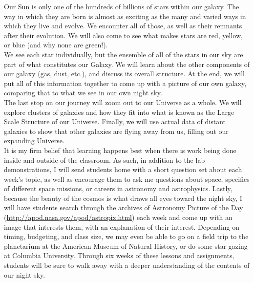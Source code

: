 \documentclass[12pt]{article}
\begin{document}
Our Sun is only one of the hundreds of billions of stars within our galaxy. The way in which they are born is almost as exciting as the many and varied ways in which they live and evolve. We encounter all of those, as well as their remnants after their evolution. We will also come to see what makes stars are red, yellow, or blue (and why none are green!).\\

We see each star individually, but the ensemble of all of the stars in our sky are part of what constitutes our Galaxy. We will learn about the other components of our galaxy (gas, dust, etc.), and discuss its overall structure. At the end, we will put all of this information together to come up with a picture of our own galaxy,  comparing that to what we see in our own night sky.\\

The last stop on our journey will zoom out to our Universe as a whole. We will explore clusters of galaxies and how they fit into what is known as the Large Scale Structure of our Universe. Finally, we will use actual data of distant galaxies to show that other galaxies are flying away from us, filling out our expanding Universe.\\

It is my firm belief that learning happens best when there is work being done inside and outside of the classroom. As such, in addition to the lab demonstrations, I will send students home with a short question set about each week's topic, as well as encourage them to ask me questions about space, specifics of different space missions, or careers in astronomy and astrophysics. Lastly, because the beauty of the cosmos is what draws all eyes toward the night sky, I will have students search through the archives of Astronomy Picture of the Day (\url{http://apod.nasa.gov/apod/astropix.html}) each week and come up with an image that interests them, with an explanation of their interest. Depending on timing, budgeting, and class size, we may even be able to go on a field trip to the planetarium at the American Museum of Natural History, or do some star gazing at Columbia University. Through six weeks of these lessons and assignments, students will be sure to walk away with a deeper understanding of the contents of our night sky.
\end{document}
